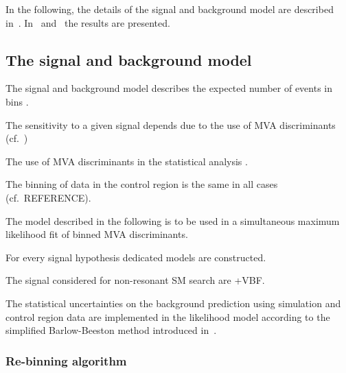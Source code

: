 In the following, the details of the signal and background model are
described in~. In~
and~ the results are presented.



\subsection{The signal and background model}%
\label{sec:sig_bkg_model}

The signal and background model describes the expected number of
events in bins .

The sensitivity to a given signal depends due to the use of MVA
discriminants (cf.\ )

The use of MVA discriminants in the statistical analysis .

The binning of data in the \ZHF control region is the same in all
cases (cf.\ REFERENCE).


The model described in the following is to be used in a simultaneous
maximum likelihood fit of binned MVA discriminants.

For every signal hypothesis dedicated models are constructed.

The signal considered for non-resonant SM \HH search are \ggF+VBF.


The statistical uncertainties on the background prediction using
simulation and control region data are implemented in the likelihood
model according to the simplified Barlow-Beeston method introduced
in~.


\subsubsection{Re-binning algorithm}%
\label{sec:binning_alg}

